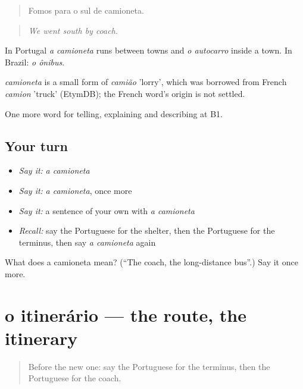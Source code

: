 \begin{quote}
Fomos para o sul de camioneta.
\end{quote}

\begin{quote}
\emph{We went south by coach.}
\end{quote}

In Portugal \emph{a camioneta} runs between towns and \emph{o autocarro} inside a town. In Brazil: \emph{o ônibus}.

\begin{cousinweb}
\emph{camioneta} is a small form of \emph{camião} 'lorry', which was borrowed from French \emph{camion} 'truck' (EtymDB); the French word's origin is not settled.
\end{cousinweb}

\begin{grammarlens}[title={What you've built}]
One more word for telling, explaining and describing at B1.
\end{grammarlens}

\subsection*{Your turn}
\begin{itemize}
\raggedright
  \item \emph{Say it:} \emph{a camioneta}
  \item \emph{Say it:} \emph{a camioneta}, once more
  \item \emph{Say it:} a sentence of your own with \emph{a camioneta}
  \item \emph{Recall:} say the Portuguese for the shelter, then the Portuguese for the terminus, then say \emph{a camioneta} again
\end{itemize}

\begin{tcolorbox}[breakable,colback=teal!4,colframe=teal!35!black,title={Before you move on}]
What does a camioneta mean? (\textquotedblleft{}The coach, the long-distance bus\textquotedblright{}.) Say it once more.
\end{tcolorbox}
\section[o itinerário]{o itinerário — the route, the itinerary}

\label{lesson:PT-C413-itinerario}



\begin{quote}
Before the new one: say the Portuguese for the terminus, then the Portuguese for the coach.
\end{quote}

